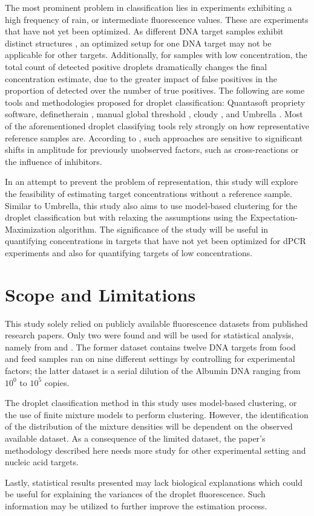 The most prominent problem in classification lies in experiments exhibiting a high frequency of rain, or intermediate fluorescence values. These are experiments that have not yet been optimized. As different DNA target samples exhibit distinct structures \cite{Lievens2016}, an optimized setup for one DNA target may not be applicable for other targets. Additionally, for samples with low concentration, the total count of detected positive droplets dramatically changes the final concentration estimate, due to the greater impact of false positives in the proportion of detected over the number of true positives. The following are some tools and methodologies proposed for droplet classification: Quantasoft propriety software, definetherain \cite{Jones2014}, manual global threshold \cite{Dreo2014}, cloudy \cite{Lievens2016}, and Umbrella \cite{Jacobs2017}. Most of the aforementioned droplet classifying tools rely strongly on how representative reference samples are. According to , such approaches are sensitive to significant shifts in amplitude for previously unobserved factors, such as cross-reactions or the influence of inhibitors.

In an attempt to prevent the problem of representation, this study will explore the feasibility of estimating target concentrations without a reference sample. Similar to Umbrella, this study also aims to use model-based clustering for the droplet classification but with relaxing the assumptions using the Expectation-Maximization algorithm. The significance of the study will be useful in quantifying concentrations in targets that have not yet been optimized for dPCR experiments and also for quantifying targets of low concentrations. 

\section{Scope and Limitations}
\label{sec:significance}
This study solely relied on publicly available fluorescence datasets from published research papers. Only two were found and will be used for statistical analysis, namely from  and . The former dataset contains twelve DNA targets from food and feed samples ran on nine different settings by controlling for experimental factors; the latter dataset is a serial dilution of the Albumin DNA ranging from \(10^0\) to \(10^5\) copies. 

The droplet classification method in this study uses model-based clustering, or the use of finite mixture models to perform clustering. However, the identification of the distribution of the mixture densities will be dependent on the observed available dataset. As a consequence of the limited dataset, the paper's methodology described here needs more study for other experimental setting and nucleic acid targets.

Lastly, statistical results presented may lack biological explanations which could be useful for explaining the variances of the droplet fluorescence. Such information may be utilized to further improve the estimation process.